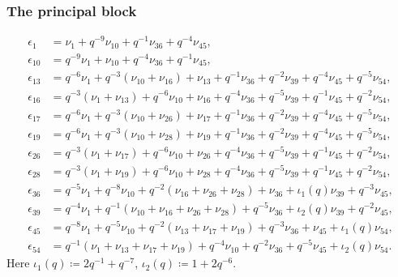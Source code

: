 
\subsubsection{The principal block}

\begin{align*}
\epsilon_{1} &= \nu_{1} + q^{-9}\nu_{10} + q^{-1}\nu_{36} + q^{-4}\nu_{45},\\
\epsilon_{10} &= q^{-9}\nu_{1} + \nu_{10} + q^{-4}\nu_{36} + q^{-1}\nu_{45},\\
\epsilon_{13} &= q^{-6}\nu_{1} + q^{-3}(\nu_{10}+\nu_{16}) + \nu_{13} + q^{-1}\nu_{36} + q^{-2}\nu_{39} + q^{-4}\nu_{45} + q^{-5}\nu_{54},\\
\epsilon_{16} &= q^{-3}(\nu_{1}+\nu_{13}) + q^{-6}\nu_{10} + \nu_{16} + q^{-4}\nu_{36} + q^{-5}\nu_{39} + q^{-1}\nu_{45} + q^{-2}\nu_{54},\\
\epsilon_{17} &= q^{-6}\nu_{1} + q^{-3}(\nu_{10}+\nu_{26}) + \nu_{17} + q^{-1}\nu_{36} + q^{-2}\nu_{39} + q^{-4}\nu_{45} + q^{-5}\nu_{54},\\
\epsilon_{19} &= q^{-6}\nu_{1} + q^{-3}(\nu_{10}+\nu_{28}) + \nu_{19} + q^{-1}\nu_{36} + q^{-2}\nu_{39} + q^{-4}\nu_{45} + q^{-5}\nu_{54},\\
\epsilon_{26} &= q^{-3}(\nu_{1}+\nu_{17}) + q^{-6}\nu_{10} + \nu_{26} + q^{-4}\nu_{36} + q^{-5}\nu_{39} + q^{-1}\nu_{45} + q^{-2}\nu_{54},\\
\epsilon_{28} &= q^{-3}(\nu_{1}+\nu_{19}) + q^{-6}\nu_{10} + \nu_{28} + q^{-4}\nu_{36} + q^{-5}\nu_{39} + q^{-1}\nu_{45} + q^{-2}\nu_{54},\\
\epsilon_{36} &= q^{-5}\nu_{1} + q^{-8}\nu_{10} + q^{-2}(\nu_{16}+\nu_{26}+\nu_{28}) + \nu_{36} + \iota_{1}(q)\nu_{39} + q^{-3}\nu_{45},\\
\epsilon_{39} &= q^{-4}\nu_{1} + q^{-1}(\nu_{10}+\nu_{16}+\nu_{26}+\nu_{28}) + q^{-5}\nu_{36} + \iota_{2}(q)\nu_{39} + q^{-2}\nu_{45},\\
\epsilon_{45} &= q^{-8}\nu_{1} + q^{-5}\nu_{10} + q^{-2}(\nu_{13}+\nu_{17}+\nu_{19}) + q^{-3}\nu_{36} + \nu_{45} + \iota_{1}(q)\nu_{54},\\
\epsilon_{54} &= q^{-1}(\nu_{1}+\nu_{13}+\nu_{17}+\nu_{19}) + q^{-4}\nu_{10} + q^{-2}\nu_{36} + q^{-5}\nu_{45} + \iota_{2}(q)\nu_{54}.
\end{align*}
Here $\iota_{1}(q)\coloneqq 2q^{-1} + q^{-7}$, $\iota_{2}(q)\coloneqq 1 + 2q^{-6}$.

